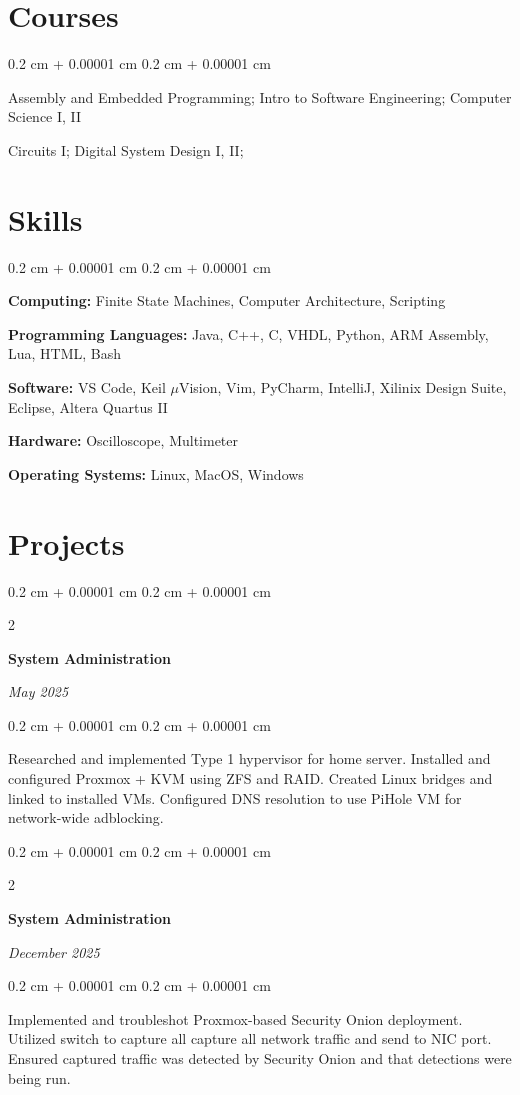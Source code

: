 \documentclass[10pt, letterpaper]{article}
\newenvironment{onecolentry}{
    \begin{adjustwidth}{
        0.2 cm + 0.00001 cm
    }{
        0.2 cm + 0.00001 cm
    }
}{
    \end{adjustwidth}
} %
\newenvironment{twocolentry}[2][]{
    \onecolentry
    \def\secondColumn{#2}
    \setcolumnwidth{\fill, 4.5 cm}
    \begin{paracol}{2}
}{
    \switchcolumn \raggedleft \secondColumn
    \end{paracol}
    \endonecolentry
} %
\begin{document}
\section{Courses}

\begin{onecolentry}
	Assembly and Embedded Programming; Intro to Software Engineering; Computer Science I, II

	Circuits I; Digital System Design I, II;
\end{onecolentry}


\section{Skills}

\begin{onecolentry}
	\textbf{Computing:} Finite State Machines, Computer Architecture, Scripting

	\textbf{Programming Languages:} Java, C++, C, VHDL, Python, ARM Assembly, Lua, HTML, Bash

	\textbf{Software:} VS Code, Keil $\mu$Vision, Vim, PyCharm, IntelliJ, Xilinix Design Suite, Eclipse, Altera Quartus II

	\textbf{Hardware:} Oscilloscope, Multimeter

	\textbf{Operating Systems:} Linux, MacOS, Windows
\end{onecolentry}


\section{Projects}

\begin{twocolentry}{ \textit{May 2025} }
	\textbf{System Administration}
\end{twocolentry}
\begin{onecolentry}
	Researched and implemented Type 1 hypervisor for home server. Installed and
	configured Proxmox + KVM using ZFS and RAID. Created Linux bridges and
	linked to installed VMs. Configured DNS resolution to use PiHole VM for
	network-wide adblocking.
\end{onecolentry}

\vspace{0.10 cm}
\begin{twocolentry}{ \textit{December 2025} }
	\textbf{System Administration}
\end{twocolentry}
\begin{onecolentry}
	Implemented and troubleshot Proxmox-based Security Onion deployment.
	Utilized switch to capture all capture all network traffic and send to NIC
	port. Ensured captured traffic was detected by Security Onion and that
	detections were being run.
\end{onecolentry}
\end{document}
